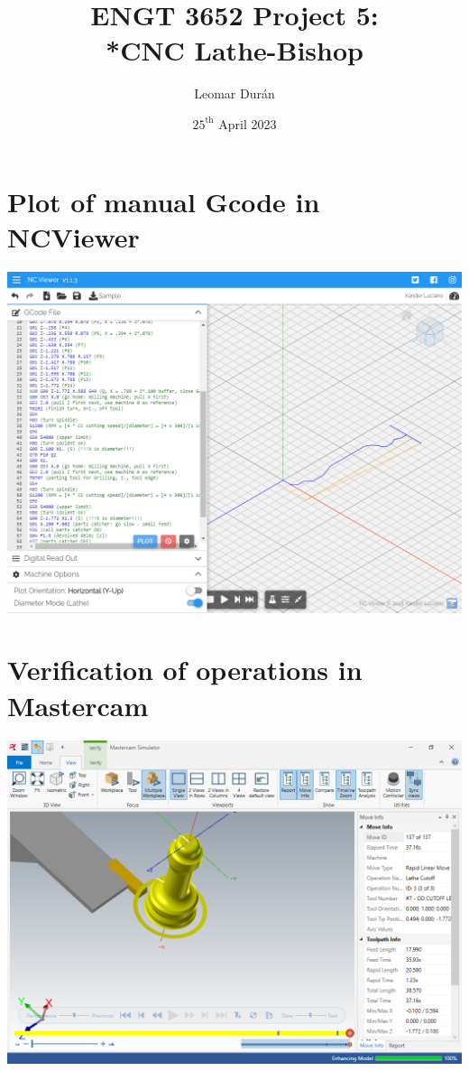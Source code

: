\documentclass{report}
\title{ENGT 3652 Project 5:\\*CNC Lathe-Bishop}
\author{Leomar Dur\'an}
\date{${25}^{\text{th}}$ April 2023}
\begin{document}
\maketitle



\chapter{Plot of manual Gcode in NCViewer}
\begin{landscape}
\includegraphics[height=\textheight]{img/prj05-manual-gcode-ncviewer-plot.png}
\end{landscape}

\chapter{Verification of operations in Mastercam}
\begin{landscape}
\vfill\null
\includegraphics[width=\linewidth]{img/prj05-mastercam_simulator-verification.png}
\vfill\null
\end{landscape}
\end{document}
